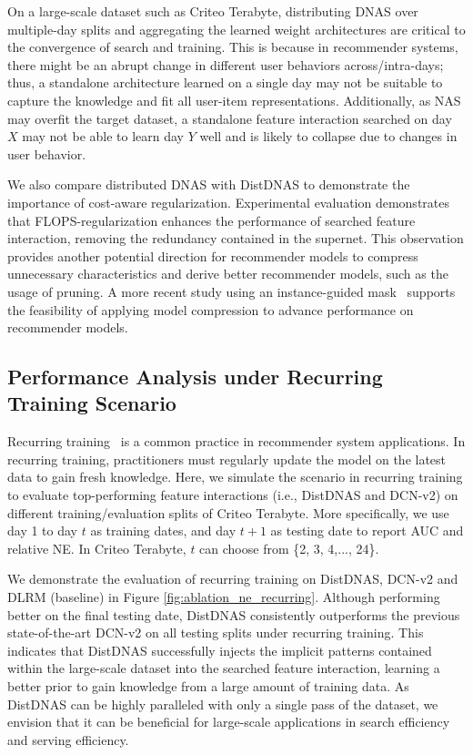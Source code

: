 On a large-scale dataset such as Criteo Terabyte, distributing DNAS over multiple-day splits and aggregating the learned weight architectures are critical to the convergence of search and training.
This is because in recommender systems, there might be an abrupt change in different user behaviors across/intra-days; thus, a standalone architecture learned on a single day may not be suitable to capture the knowledge and fit all user-item representations. Additionally, as NAS may overfit the target dataset, a standalone feature interaction searched on day $X$ may not be able to learn day $Y$ well and is likely to collapse due to changes in user behavior.

We also compare distributed DNAS with DistDNAS to demonstrate the importance of cost-aware regularization. 
Experimental evaluation demonstrates that FLOPS-regularization enhances the performance of searched feature interaction, removing the redundancy contained in the supernet. This observation provides another potential direction for recommender models to compress unnecessary characteristics and derive better recommender models, such as the usage of pruning. A more recent study using an instance-guided mask~\cite{wang2021masknet} supports the feasibility of applying model compression to advance performance on recommender models.


\subsection{Performance Analysis under Recurring Training Scenario}
Recurring training~\cite{he2014practical} is a common practice in recommender system applications. In recurring training, practitioners must regularly update the model on the latest data to gain fresh knowledge. Here, we simulate the scenario in recurring training to evaluate top-performing feature interactions (i.e., DistDNAS and DCN-v2) on different training/evaluation splits of Criteo Terabyte. More specifically, we use day 1 to day $t$ as training dates, and day $t+1$ as testing date to report AUC and relative NE. 
In Criteo Terabyte, $t$ can choose from \{2, 3, 4,..., 24\}.

We demonstrate the evaluation of recurring training on DistDNAS, DCN-v2 and DLRM (baseline) in Figure \ref{fig:ablation_ne_recurring}.
Although performing better on the final testing date, DistDNAS consistently outperforms the previous state-of-the-art DCN-v2 on all testing splits under recurring training. This indicates that DistDNAS successfully injects the implicit patterns contained within the large-scale dataset into the searched feature interaction, learning a better prior to gain knowledge from a large amount of training data.
As DistDNAS can be highly paralleled with only a single pass of the dataset, we envision that it can be beneficial for large-scale applications in search efficiency and serving efficiency.  






